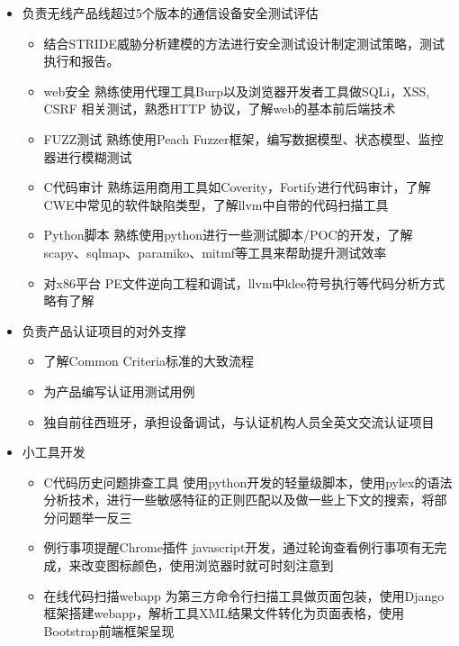 \documentclass{resume}
\begin{document}
\begin{itemize}
  \item 负责无线产品线超过5个版本的通信设备安全测试评估
  \begin{itemize}
    \item 结合STRIDE威胁分析建模的方法进行安全测试设计制定测试策略，测试执行和报告。
    \item web安全 熟练使用代理工具Burp以及浏览器开发者工具做SQLi，XSS, CSRF 相关测试，熟悉HTTP 协议，了解web的基本前后端技术
    \item FUZZ测试 熟练使用Peach Fuzzer框架，编写数据模型、状态模型、监控器进行模糊测试
    \item C代码审计 熟练运用商用工具如Coverity，Fortify进行代码审计，了解CWE中常见的软件缺陷类型，了解llvm中自带的代码扫描工具
    \item Python脚本 熟练使用python进行一些测试脚本/POC的开发，了解scapy、sqlmap、paramiko、mitmf等工具来帮助提升测试效率
    \item 对x86平台 PE文件逆向工程和调试，llvm中klee符号执行等代码分析方式略有了解
  \end{itemize}

  \item 负责产品认证项目的对外支撑
  \begin{itemize}
    \item 了解Common Criteria标准的大致流程
    \item 为产品编写认证用测试用例
    \item 独自前往西班牙，承担设备调试，与认证机构人员全英文交流认证项目
  \end{itemize}

  \item 小工具开发
  \begin{itemize}
    \item C代码历史问题排查工具 使用python开发的轻量级脚本，使用pylex的语法分析技术，进行一些敏感特征的正则匹配以及做一些上下文的搜索，将部分问题举一反三
    \item 例行事项提醒Chrome插件 javascript开发，通过轮询查看例行事项有无完成，来改变图标颜色，使用浏览器时就可时刻注意到
    \item 在线代码扫描webapp 为第三方命令行扫描工具做页面包装，使用Django框架搭建webapp，解析工具XML结果文件转化为页面表格，使用Bootstrap前端框架呈现
  \end{itemize}
\end{itemize}



\end{document}
